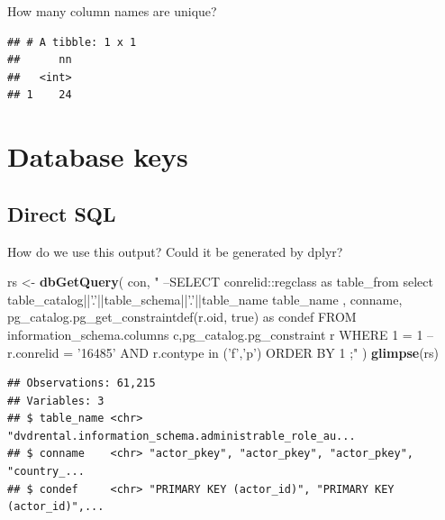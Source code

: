 \documentclass[]{book}
\newenvironment{Shaded}{\begin{snugshade}}{\end{snugshade}}
\newcommand{\DecValTok}[1]{\textcolor[rgb]{0.00,0.00,0.81}{#1}}
\newcommand{\KeywordTok}[1]{\textcolor[rgb]{0.13,0.29,0.53}{\textbf{#1}}}
\newcommand{\NormalTok}[1]{#1}
\newcommand{\OperatorTok}[1]{\textcolor[rgb]{0.81,0.36,0.00}{\textbf{#1}}}
\newcommand{\StringTok}[1]{\textcolor[rgb]{0.31,0.60,0.02}{#1}}
\theoremstyle{definition}
\theoremstyle{definition}
\theoremstyle{definition}
\theoremstyle{remark}
\begin{document}
How many column names are unique?

\begin{Shaded}
\end{Shaded}

\begin{verbatim}
## # A tibble: 1 x 1
##      nn
##   <int>
## 1    24
\end{verbatim}

\hypertarget{database-keys}{%
\section{Database keys}\label{database-keys}}

\hypertarget{direct-sql}{%
\subsection{Direct SQL}\label{direct-sql}}

How do we use this output? Could it be generated by dplyr?

\begin{Shaded}
\begin{Highlighting}[]
\NormalTok{rs <-}\StringTok{ }\KeywordTok{dbGetQuery}\NormalTok{(}
\NormalTok{  con,}
  \StringTok{"}
\StringTok{--SELECT conrelid::regclass as table_from}
\StringTok{select table_catalog||'.'||table_schema||'.'||table_name table_name}
\StringTok{, conname, pg_catalog.pg_get_constraintdef(r.oid, true) as condef}
\StringTok{FROM information_schema.columns c,pg_catalog.pg_constraint r}
\StringTok{WHERE 1 = 1 --r.conrelid = '16485' }
\StringTok{  AND r.contype  in ('f','p') ORDER BY 1}
\StringTok{;"}
\NormalTok{)}
\KeywordTok{glimpse}\NormalTok{(rs)}
\end{Highlighting}
\end{Shaded}

\begin{verbatim}
## Observations: 61,215
## Variables: 3
## $ table_name <chr> "dvdrental.information_schema.administrable_role_au...
## $ conname    <chr> "actor_pkey", "actor_pkey", "actor_pkey", "country_...
## $ condef     <chr> "PRIMARY KEY (actor_id)", "PRIMARY KEY (actor_id)",...
\end{verbatim}
\end{document}
